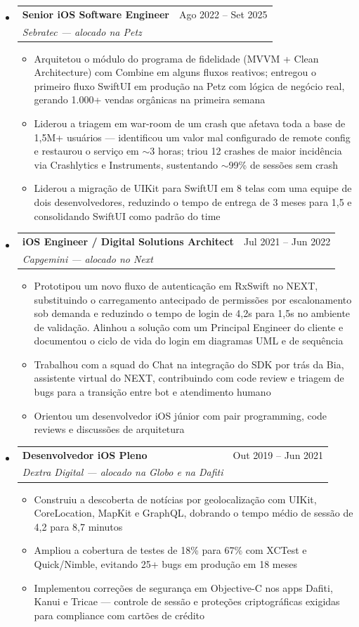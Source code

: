 \documentclass[11pt,letterpaper]{article}
\makeatletter
\newcommand{\resumeSubheading}[4]{
  \item
    \begin{tabular*}{\linewidth}{l@{\extracolsep{\fill}}r}
      \textbf{#1} & #2 \\
      \textit{#3} & \textit{#4} \\
    \end{tabular*}
}
\newcommand{\resumeItem}[1]{
  \item{#1}
}
\makeatother
\begin{document}
\begin{itemize}[leftmargin=0.15in, label={}]
    \resumeSubheading
        {Senior iOS Software Engineer}{Ago 2022 -- Set 2025}
        {Sebratec --- alocado na Petz}{}
        \begin{itemize}
            \resumeItem{Arquitetou o módulo do programa de fidelidade (MVVM + Clean Architecture) com Combine em alguns fluxos reativos; entregou o primeiro fluxo SwiftUI em produção na Petz com lógica de negócio real, gerando 1.000+ vendas orgânicas na primeira semana}
            \resumeItem{Liderou a triagem em war-room de um crash que afetava toda a base de 1,5M+ usuários --- identificou um valor mal configurado de remote config e restaurou o serviço em $\sim$3 horas; triou 12 crashes de maior incidência via Crashlytics e Instruments, sustentando $\sim$99\% de sessões sem crash}
            \resumeItem{Liderou a migração de UIKit para SwiftUI em 8 telas com uma equipe de dois desenvolvedores, reduzindo o tempo de entrega de 3 meses para 1,5 e consolidando SwiftUI como padrão do time}
        \end{itemize}

    \resumeSubheading
        {iOS Engineer / Digital Solutions Architect}{Jul 2021 -- Jun 2022}
        {Capgemini --- alocado no Next}{}
        \begin{itemize}
            \resumeItem{Prototipou um novo fluxo de autenticação em RxSwift no NEXT, substituindo o carregamento antecipado de permissões por escalonamento sob demanda e reduzindo o tempo de login de 4,2s para 1,5s no ambiente de validação. Alinhou a solução com um Principal Engineer do cliente e documentou o ciclo de vida do login em diagramas UML e de sequência}
            \resumeItem{Trabalhou com a squad do Chat na integração do SDK por trás da Bia, assistente virtual do NEXT, contribuindo com code review e triagem de bugs para a transição entre bot e atendimento humano}
            \resumeItem{Orientou um desenvolvedor iOS júnior com pair programming, code reviews e discussões de arquitetura}
        \end{itemize}

    \resumeSubheading
        {Desenvolvedor iOS Pleno}{Out 2019 -- Jun 2021}
        {Dextra Digital --- alocado na Globo e na Dafiti}{}
        \begin{itemize}
            \resumeItem{Construiu a descoberta de notícias por geolocalização com UIKit, CoreLocation, MapKit e GraphQL, dobrando o tempo médio de sessão de 4,2 para 8,7 minutos}
            \resumeItem{Ampliou a cobertura de testes de 18\% para 67\% com XCTest e Quick/Nimble, evitando 25+ bugs em produção em 18 meses}
            \resumeItem{Implementou correções de segurança em Objective-C nos apps Dafiti, Kanui e Tricae --- controle de sessão e proteções criptográficas exigidas para compliance com cartões de crédito}
        \end{itemize}


\end{itemize}
\end{document}

